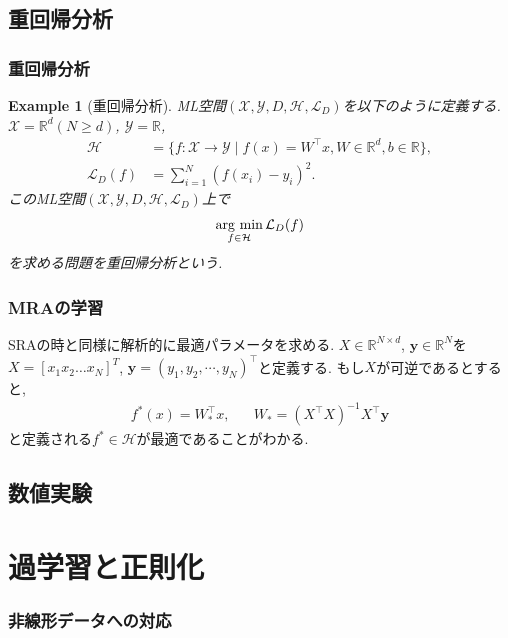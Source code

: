 \documentclass[dvipdfmx,11pt]{beamer}		%
\newtheorem{exam}[defi]{Example}
\newcommand{\R}{\mathbb{R}}
\newcommand{\X}{\mathcal{X}}
\newcommand{\Y}{\mathcal{Y}}
\newcommand{\Hil}{\mathcal{H}}
\newcommand{\Loss}{\mathcal{L}_{D}}
\newcommand{\MLsp}{(\X, \Y, D, \Hil, \Loss)}
\newcommand{\argmin}{\mathop{\rm arg~min}\limits}
\begin{document}
    \subsection{重回帰分析}
    \begin{frame}
        \frametitle{重回帰分析}
        \begin{exam}[重回帰分析]
            ML空間$\MLsp$を以下のように定義する.\\
            $\X = \R^d(N\geq d)$, $\Y = \R$, 
            \begin{align*}
                \Hil &= \{f:\X\to\Y\mid f(x) = W^{\top}x, W\in\R^{d}, b\in\R\},\\
                \Loss(f) &= \sum_{i = 1}^{N}(f(x_i) - y_i)^2.
            \end{align*}
            このML空間$\MLsp$上で
            \begin{align*}
                \argmin_{f\in\Hil}\Loss(f)
            \end{align*}
            を求める問題を重回帰分析という.
        \end{exam}
    \end{frame}
    \begin{frame}
        \frametitle{MRAの学習}
        SRAの時と同様に解析的に最適パラメータを求める. $X\in\R^{N\times d}$, $\mathbf{y}\in\R^N$を
        $X = [x_1 x_2 \ldots x_N]^{T}$, $\mathbf{y} = (y_{1}, y_{2}, \cdots, y_{N})^{\top}$と定義する. もし$X$が可逆であるとすると, 
        \begin{align*}
            f^{*}(x) = W_*^{\top}x, \hspace{20pt} W_* = (X^\top X)^{-1}X^\top\mathbf{y}
        \end{align*}
        と定義される$f^*\in\Hil$が最適であることがわかる. 
    \end{frame}
    
    \subsection{数値実験}
    \section{過学習と正則化}
    \begin{frame}\frametitle{非線形データへの対応}
        
    \end{frame}
\end{document}
